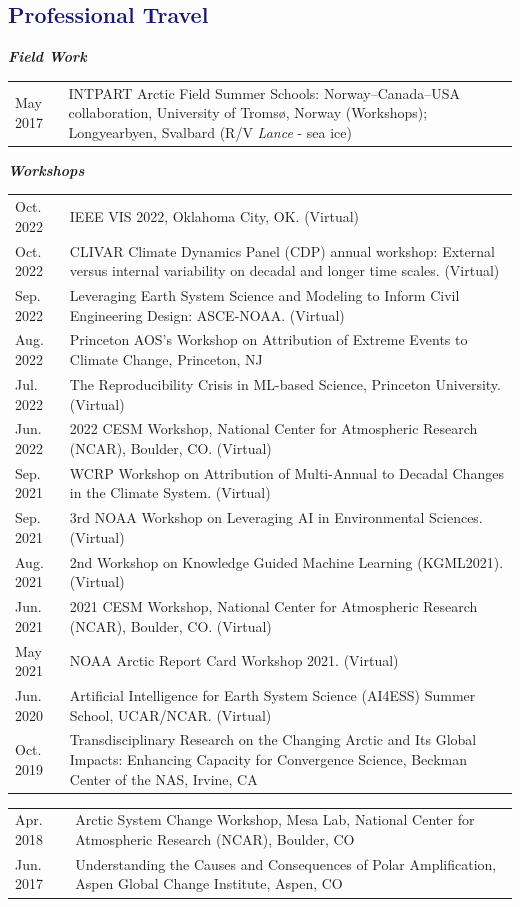 \documentclass[margin,line,palatino,courier,10pt]{res}
\begin{document}
\begin{resume}
\section{\sc \textcolor{MidnightBlue}{\large{\textbf{Professional Travel}}}}
\textit{\textbf{Field Work}}
\vspace*{0.05in}\\
\begin{tabular}{@{}p{0.9in}p{4in}}
May 2017 & INTPART Arctic Field Summer Schools: Norway--Canada--USA collaboration, University of Troms\o, Norway (Workshops); Longyearbyen, Svalbard (R/V \textit{Lance} - sea ice)
\end{tabular}

\textit{\textbf{Workshops}}
\vspace*{0.05in}\\
\begin{tabular}{@{}p{0.9in}p{4in}}
Oct. 2022 & IEEE VIS 2022, Oklahoma City, OK. (Virtual)\\
Oct. 2022 & CLIVAR Climate Dynamics Panel (CDP) annual workshop: External versus internal variability on decadal and longer time scales. (Virtual)\\
Sep. 2022 & Leveraging Earth System Science and Modeling to Inform Civil Engineering Design: ASCE-NOAA. (Virtual)\\
Aug. 2022 & Princeton AOS's Workshop on Attribution of Extreme Events to Climate Change, Princeton, NJ\\
Jul. 2022 & The Reproducibility Crisis in ML-based Science, Princeton University. (Virtual)\\
Jun. 2022 & 2022 CESM Workshop, National Center for Atmospheric Research (NCAR), Boulder, CO. (Virtual)\\
Sep. 2021 & WCRP Workshop on Attribution of Multi-Annual to Decadal Changes in the Climate System. (Virtual)\\
Sep. 2021 & 3rd NOAA Workshop on Leveraging AI in Environmental Sciences. (Virtual)\\
Aug. 2021 & 2nd Workshop on Knowledge Guided Machine Learning (KGML2021). (Virtual)\\
Jun. 2021 & 2021 CESM Workshop, National Center for Atmospheric Research (NCAR), Boulder, CO. (Virtual)\\
May 2021 & NOAA Arctic Report Card Workshop 2021. (Virtual)\\
Jun. 2020 & Artificial Intelligence for Earth System Science (AI4ESS) Summer School, UCAR/NCAR. (Virtual)\\
Oct. 2019 & Transdisciplinary Research on the Changing Arctic and Its Global Impacts:  Enhancing Capacity for Convergence Science, Beckman Center of the NAS, Irvine, CA\\
\end{tabular}
\begin{tabular}{@{}p{0.9in}p{4in}}
Apr. 2018 & Arctic System Change Workshop, Mesa Lab, National Center for Atmospheric Research (NCAR), Boulder, CO\\
Jun. 2017 & Understanding the Causes and Consequences of Polar Amplification, Aspen Global Change Institute, Aspen, CO
\end{tabular}


\end{resume}
\end{document}

